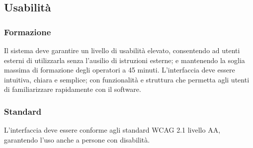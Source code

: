 \subsection{Usabilità}
\subsubsection{Formazione}
Il sistema deve garantire un livello di usabilità elevato, consentendo ad utenti esterni di utilizzarla senza l’ausilio di istruzioni esterne; e mantenendo la soglia massima di formazione degli operatori a 45 minuti. L’interfaccia deve essere intuitiva, chiara e semplice; con funzionalità e struttura che permetta agli utenti di familiarizzare rapidamente con il software.
\subsubsection{Standard}
 L’interfaccia deve essere conforme agli standard WCAG 2.1 livello AA, garantendo l’uso anche a persone con disabilità.
